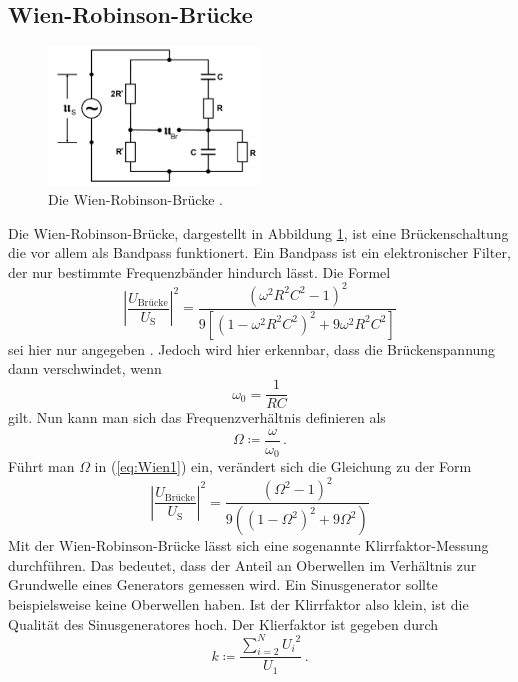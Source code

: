 \subsection{Wien-Robinson-Brücke}

\begin{figure}
    \centering
    \includegraphics[width=0.5\textwidth]{pictures/Schaltung6.png}
    \caption{Die Wien-Robinson-Brücke \cite[8]{v302}.}
    \label{fig:Schaltung6}
\end{figure}

Die Wien-Robinson-Brücke, dargestellt in Abbildung \ref{fig:Schaltung6}, ist eine Brückenschaltung
die vor allem als Bandpass funktionert. 
Ein Bandpass ist ein elektronischer Filter, der  nur bestimmte Frequenzbänder hindurch lässt.
Die Formel
\begin{equation} \label{eq:Wien1}
    \left|\frac{U_\text{Brücke}}{U_\text{S}}\right|^2 =  \frac{\left({\omega}^2 R^2 C^2 -1 \right)^2}
    {9 \left[ \left( 1 - {\omega}^2 R^2 C^2 \right)^2 + 9 {\omega}^2 R^2 C^2 \right]}
\end{equation}
sei hier nur angegeben \cite[9]{v302}.
Jedoch wird hier erkennbar, dass die Brückenspannung dann verschwindet, wenn
\begin{equation*}
    \omega_0 = \frac{1}{R C}
\end{equation*}
gilt. Nun kann man sich das Frequenzverhältnis definieren als
\begin{equation*}
    \Omega \coloneq \frac{\omega}{\omega_0} \, .
\end{equation*}
Führt man $\Omega$ in (\ref{eq:Wien1}) ein, verändert sich die Gleichung zu der Form
\begin{equation} \label{eq:Wien2}
    \left|\frac{U_\text{Brücke}}{U_\text{S}}\right|^2 = \frac{\left( \Omega^2 -1 \right)^2}
    {9 \left( \left( 1 - \Omega^2 \right)^2 + 9 \Omega^2 \right)}
\end{equation}
Mit der Wien-Robinson-Brücke lässt sich eine sogenannte Klirrfaktor-Messung durchführen.
Das bedeutet, dass der Anteil an Oberwellen im Verhältnis zur Grundwelle eines Generators gemessen wird.
Ein Sinusgenerator sollte beispielsweise keine Oberwellen haben.
Ist der Klirrfaktor also klein, ist die Qualität des Sinusgeneratores hoch.
Der Klierfaktor ist gegeben durch
\begin{equation} \label{eq:klirr}
    k \coloneq \frac {\sum_{i=2}^{N} {U_i}^2}{U_1}  \, .
\end{equation}